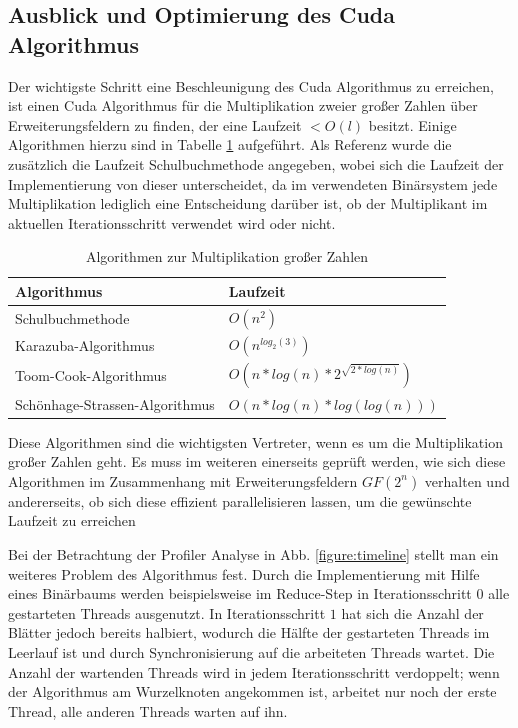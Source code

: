 {\subsection{Ausblick und Optimierung des Cuda Algorithmus}
Der wichtigste Schritt eine Beschleunigung des Cuda Algorithmus zu erreichen, ist einen Cuda Algorithmus für die Multiplikation zweier großer Zahlen über Erweiterungsfeldern zu finden, der eine Laufzeit $<O(l)$ besitzt. Einige Algorithmen hierzu sind in Tabelle \ref{table:bnmult} aufgeführt. Als Referenz wurde die zusätzlich die Laufzeit Schulbuchmethode angegeben, wobei sich die Laufzeit der Implementierung von dieser unterscheidet, da im verwendeten Binärsystem jede Multiplikation lediglich eine Entscheidung darüber ist, ob der Multiplikant im aktuellen Iterationsschritt verwendet wird oder nicht.

\begin{table}
\centering
\begin{tabular}{ll}
\toprule
Algorithmus & Laufzeit \\
\midrule
Schulbuchmethode & $O(n^2)$ \\
Karazuba-Algorithmus & $O(n^{log_2(3)})$ \\
Toom-Cook-Algorithmus & $O(n*log(n)*2^{\sqrt{2*log(n)}})$ \\
Schönhage-Strassen-Algorithmus & $O(n*log(n)*log(log(n)))$ \\
\bottomrule
\end{tabular}
\caption{Algorithmen zur Multiplikation großer Zahlen}
\label{table:bnmult}
\end{table}

Diese Algorithmen sind die wichtigsten Vertreter, wenn es um die Multiplikation großer Zahlen geht. Es muss im weiteren einerseits geprüft werden, wie sich diese Algorithmen im Zusammenhang mit Erweiterungsfeldern $GF(2^n)$ verhalten und andererseits, ob sich diese effizient parallelisieren lassen, um die gewünschte Laufzeit zu erreichen\newline

Bei der Betrachtung der Profiler Analyse in Abb. \ref{figure:timeline} stellt man ein weiteres Problem des Algorithmus fest. Durch die Implementierung mit Hilfe eines Binärbaums werden beispielsweise im Reduce-Step in Iterationsschritt $0$ alle gestarteten Threads ausgenutzt. In Iterationsschritt $1$ hat sich die Anzahl der Blätter jedoch bereits halbiert, wodurch die Hälfte der gestarteten Threads im Leerlauf ist und durch Synchronisierung auf die arbeiteten Threads wartet. Die Anzahl der wartenden Threads wird in jedem Iterationsschritt verdoppelt; wenn der Algorithmus am Wurzelknoten angekommen ist, arbeitet nur noch der erste Thread, alle anderen Threads warten auf ihn.

}

